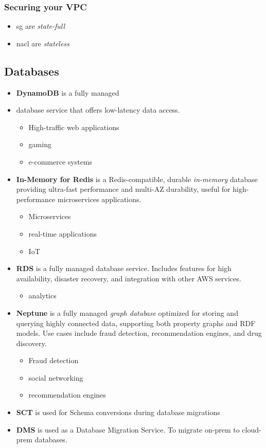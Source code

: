 \subsubsection{Securing your VPC}

\begin{itemize}
    \item \Gls{sg} are \textit{state-full}
    \item \Gls {nacl} are \textit{stateless}
\end{itemize}

\subsection{Databases}

\begin{itemize}
    \item \textbf{DynamoDB} is a fully managed \item  database service that offers low-latency data access.
    \begin{itemize}
        \item High-traffic web applications
        \item gaming
        \item e-commerce systems
    \end{itemize}
    \item \textbf{In-Memory for Redis} is a Redis-compatible, durable \textit{in-memory }database providing ultra-fast performance and multi-AZ durability, useful for high-performance microservices applications.
    \begin{itemize}
        \item Microservices
        \item real-time applications
        \item IoT
    \end{itemize}
    \item \textbf{RDS} is a fully managed database service. Includes features for high availability, disaster recovery, and integration with other AWS services.
    \begin{itemize}
        \itemBusiness-critical workloads
        \item analytics
    \end{itemize}
    \item \textbf{Neptune} is a fully managed \textit{graph database} optimized for storing and querying highly connected data, supporting both property graphs and RDF models. Use cases include fraud detection, recommendation engines, and drug discovery.
    \begin{itemize}
        \item Fraud detection
        \item social networking
        \item recommendation engines
    \end{itemize}
    \item \textbf{SCT} is used for Schema conversions during database migrations
    \item \textbf{DMS} is used as a Database Migration Service. To migrate on-prem to cloud-prem databases.
\end{itemize}